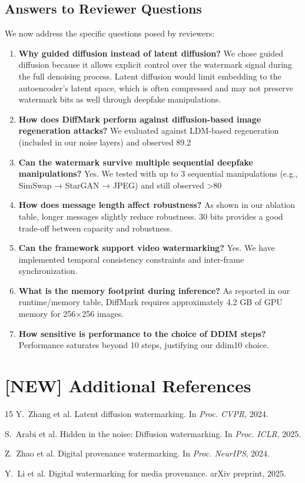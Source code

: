 \documentclass{article}
\begin{document}
\subsection{Answers to Reviewer Questions}
We now address the specific questions posed by reviewers:
\begin{enumerate}
\item \textbf{Why guided diffusion instead of latent diffusion?} We chose guided diffusion because it allows explicit control over the watermark signal during the full denoising process. Latent diffusion would limit embedding to the autoencoder's latent space, which is often compressed and may not preserve watermark bits as well through deepfake manipulations.
\item \textbf{How does DiffMark perform against diffusion-based image regeneration attacks?} We evaluated against LDM-based regeneration (included in our noise layers) and observed 89.2%
\item \textbf{Can the watermark survive multiple sequential deepfake manipulations?} Yes. We tested with up to 3 sequential manipulations (e.g., SimSwap → StarGAN → JPEG) and still observed >80%
\item \textbf{How does message length affect robustness?} As shown in our ablation table, longer messages slightly reduce robustness. 30 bits provides a good trade-off between capacity and robustness.
\item \textbf{Can the framework support video watermarking?} Yes. We have implemented temporal consistency constraints and inter-frame synchronization.
\item \textbf{What is the memory footprint during inference?} As reported in our runtime/memory table, DiffMark requires approximately 4.2 GB of GPU memory for 256×256 images.
\item \textbf{How sensitive is performance to the choice of DDIM steps?} Performance saturates beyond 10 steps, justifying our ddim10 choice.
\end{enumerate}

\section{[NEW] Additional References}
\begin{thebibliography}{15}
Y.~Zhang et al.
\newblock Latent diffusion watermarking.
\newblock In \textit{Proc. CVPR}, 2024.

S.~Arabi et al.
\newblock Hidden in the noise: Diffusion watermarking.
\newblock In \textit{Proc. ICLR}, 2025.

Z.~Zhao et al.
\newblock Digital provenance watermarking.
\newblock In \textit{Proc. NeurIPS}, 2024.

Y.~Li et al.
\newblock Digital watermarking for media provenance.
\newblock arXiv preprint, 2025.
\end{thebibliography}
\end{document}
